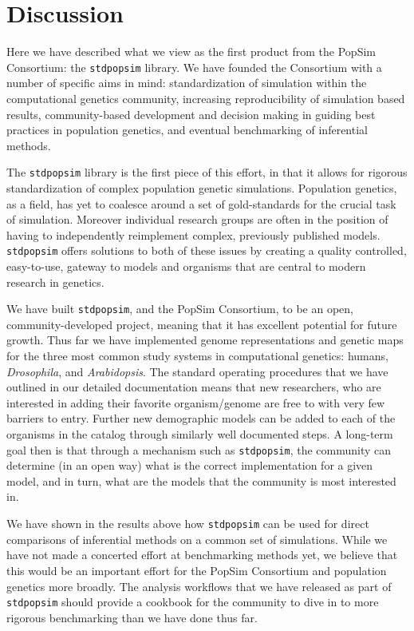 \documentclass[12pt,halfline,a4paper]{ouparticle}
\newcommand{\stdpopsim}{\texttt{stdpopsim}\xspace}
\begin{document}
\section*{Discussion}

Here we have described what we view as the first product from the PopSim Consortium:
the \stdpopsim library. We have founded the Consortium with a number of specific aims
in mind: standardization of simulation within the computational genetics community,
increasing reproducibility of simulation based results, community-based development and
decision making in guiding best practices in population genetics, and eventual benchmarking
of inferential methods.

The \stdpopsim library is the first piece of this effort, in that it allows for rigorous
standardization of complex population genetic simulations. Population genetics, as a field,
has yet to coalesce around a set of gold-standards for the crucial task of simulation.
Moreover individual research groups are often in the position of having to independently
reimplement complex, previously published models. \stdpopsim offers solutions to both of
these issues by creating a quality controlled, easy-to-use, gateway to models and organisms
that are central to modern research in genetics.

We have built \stdpopsim, and the PopSim Consortium, to be an open, community-developed
project, meaning that it has excellent potential for future growth.
Thus far we have implemented genome representations and genetic maps for the three most
common study systems in computational genetics: humans, \emph{Drosophila}, and \emph{Arabidopsis}.
The standard operating procedures that we have outlined in our detailed documentation
means that new researchers, who are interested in adding their favorite organism/genome
are free to with very few barriers to entry. Further new demographic models can be added
to each of the organisms in the catalog through similarly well documented steps.
A long-term goal then is that through a mechanism such as \stdpopsim, the community
can determine (in an open way) what is the correct implementation for a given model,
and in turn, what are the models that the community is most interested in.

We have shown in the results above how \stdpopsim can be used for direct comparisons
of inferential methods on a common set of simulations. While we have not made a concerted
effort at benchmarking methods yet, we believe that this would be an important effort for
the PopSim Consortium and population genetics more broadly. The analysis workflows that
we have released as part of \stdpopsim should provide a cookbook for the community to
dive in to more rigorous benchmarking than we have done thus far.
\end{document}
